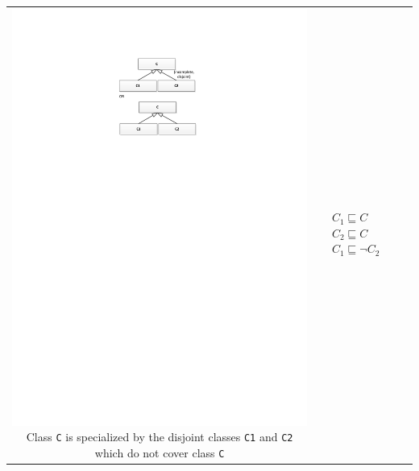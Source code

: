 \begin{longtable}{|>{\scriptsize}c|>{\scriptsize}l|>{\scriptsize}l|>{\scriptsize}p{0.8cm}|}
\begin{minipage}{\umltablespacing}
      \centering\hspace*{-5.5mm}\includegraphics[trim = 76mm 205mm 72mm 25mm, clip, scale=0.75]{./diagrams/chapter5/IncompleteDisjoint}
      Class \texttt{C} is specialized by the disjoint classes \texttt{C1} and \texttt{C2} which do not cover class \texttt{C}
     \vspace{2mm}
    \end{minipage}
    &
    \begin{minipage}{\dltablespacing}
       $\begin{aligned}    
	  &C_1 \sqsubseteq C  \\  
	  &C_2 \sqsubseteq C \\
	  &C_1 \sqsubseteq \neg C_2
         \end{aligned}$      

\end{minipage}
\end{longtable}
